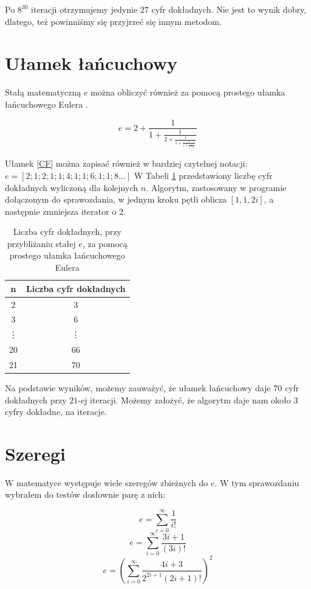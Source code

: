 \documentclass{article}
\begin{document}
Po $8^{30}$ iteracji otrzymujemy jedynie $27$ cyfr dokładnych. Nie jest to wynik dobry, dlatego, też powinniśmy się przyjrzeć się innym metodom.
\\
\section{Ułamek łańcuchowy}
Stałą matematyczną $e$ można  obliczyć również za pomocą prostego ułamka łańcuchowego Eulera \cite{CF}.

\begin{equation}\label{CF}
e = 2 + \frac{1}{1+\frac{1}{2+\frac{1}{1+\frac{1}{1+\frac{1}{4+\frac{1}{\vdots}}}}}}
\end{equation}

Ułamek \eqref{CF} można zapisać również w bardziej czytelnej notacji:  $e = [2;1;2;1;1;4;1;1;6;1;1;8...]$
W Tabeli \ref{res,cf} przedstawiony liczbę cyfr dokładnych wyliczoną dla kolejnych $n$. Algorytm, zastosowany w programie dołączonym do sprawozdania, w jednym kroku pętli oblicza $[1,1,2i]$, a następnie zmniejsza iterator o $2$. 

\begin{table}[h] 
	\centering 
	\begin{tabular}{|c|c|}
		\hline
		n & Liczba cyfr dokładnych \\ \hline
		2 & 3 \\ 
		3 & 6 \\
		\vdots & \vdots \\
		20 & 66\\
		21 & 70\\
		\hline 
	\end{tabular}
	\caption{Liczba cyfr dokładnych, przy przybliżaniu stałej $e$, za pomocą prostego ułamka łańcuchowego Eulera}
	\label{res,cf}
\end{table}

Na podstawie wyników, możemy zauważyć, że ułamek łańcuchowy daje $70$ cyfr dokładnych przy $21$-ej iteracji. Możemy założyć, że algorytm daje nam około $3$ cyfry dokładne, na iteracje.

\section{Szeregi}

W matematyce występuje wiele szeregów zbieżnych do $e$. W tym sprawozdaniu wybrałem do testów dosłownie parę z nich: \cite{SZE}

\begin{equation}\label{szereg1}
e =  \sum_{i=0}^{\infty} \frac{1}{i!} 
\end{equation}
\begin{equation}\label{szereg2}
e =   \sum_{i=0}^{\infty}  \frac{3i+1}{\left(3i\right)!} 
\end{equation}
\begin{equation}\label{szereg3}
e = \left(\sum_{i=0}^{\infty}  \frac{4i+3}{2^{2i+1}\left(2i+1\right)!}\right)^{2}
\end{equation}
\end{document}
